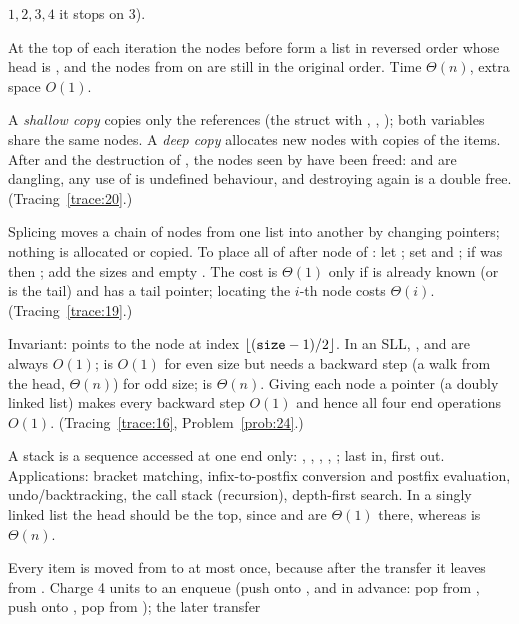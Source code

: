 \begin{questions}
  $1,2,3,4$ it stops on 3).
\item At the top of each iteration the nodes before  form a list in reversed order
  whose head is , and the nodes from  on are still in the original
  order. Time $\Theta(n)$, extra space $O(1)$.
\item A \emph{shallow copy} copies only the references (the struct with ,
  , ); both variables share the same nodes. A \emph{deep copy}
  allocates new nodes with copies of the items. After  and the destruction of
  , the nodes seen by  have been freed:  and  are
  dangling, any use of  is undefined behaviour, and destroying  again is a
  double free. (Tracing~\ref{trace:20}.)
\item Splicing moves a chain of nodes from one list into another by changing pointers;
  nothing is allocated or copied. To place all of  after node  of :
  let ; set  and ; if 
  was  then ; add the sizes and empty . The cost is
  $\Theta(1)$ only if  is already known (or is the tail) and  has a tail
  pointer; locating the $i$-th node costs $\Theta(i)$. (Tracing~\ref{trace:19}.)
\item Invariant:  points to the node at index $\lfloor(\texttt{size}-1)/2\rfloor$. In
  an SLL, ,  and  are always $O(1)$; 
  is $O(1)$ for even size but needs a backward step (a walk from the head, $\Theta(n)$)
  for odd size;  is $\Theta(n)$. Giving each node a  pointer (a
  doubly linked list) makes every backward step $O(1)$ and hence all four end operations
  $O(1)$. (Tracing~\ref{trace:16}, Problem~\ref{prob:24}.)
\item A stack is a sequence accessed at one end only: , , ,
  , ; last in, first out. Applications: bracket matching,
  infix-to-postfix conversion and postfix evaluation, undo/backtracking, the call stack
  (recursion), depth-first search. In a singly linked list the head should be the top,
  since  and  are $\Theta(1)$ there, whereas
   is $\Theta(n)$.
\item Every item is moved from  to  at most once, because after the
  transfer it leaves from . Charge 4 units to an enqueue (push onto , and
  in advance: pop from , push onto , pop from ); the later transfer

\end{questions}
